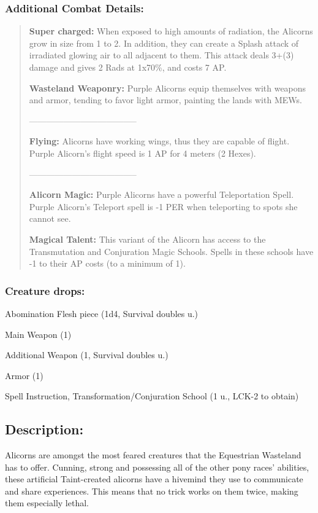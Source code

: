 \documentclass[11pt,a4paper,twocolumn]{book}
\begin{document}
	\subsubsection*{Additional Combat Details:}
	\begin{verse}
		
		\textbf{Super charged:} When exposed to high amounts of radiation, the Alicorns grow in size from 1 to 2. In addition, they can create a Splash attack of irradiated glowing air to all adjacent to them. This attack deals 3+(3) damage and gives 2 Rads at 1x70\%, and costs 7 AP.
		
		\textbf{Wasteland Weaponry:} Purple Alicorns equip themselves with weapons and armor, tending to favor light armor, painting the lands with MEWs.
		
		--------------------------------------	
		
		\textbf{Flying:} Alicorns have working wings, thus they are capable of flight. Purple Alicorn's flight speed is 1 AP for 4 meters (2 Hexes).
		
		--------------------------------------
		
		\textbf{Alicorn Magic:} Purple Alicorns have a powerful Teleportation Spell. Purple Alicorn's Teleport spell is -1 PER when teleporting to spots she cannot see.
		
		\textbf{Magical Talent:} This variant of the Alicorn has access to the Transmutation and Conjuration Magic Schools. Spells in these schools have -1 to their AP costs (to a minimum of 1).

	\end{verse}
	
	\subsubsection*{Creature drops:}
	\begin{compactitem}
		\item Abomination Flesh piece (1d4, Survival doubles u.)
		\item Main Weapon (1)
		\item Additional Weapon (1, Survival doubles u.)
		\item Armor (1)
		\item Spell Instruction, Transformation/Conjuration School (1 u., LCK-2 to obtain)
	\end{compactitem}
	
	\subsection*{Description:}	
	Alicorns are amongst the most feared creatures that the Equestrian Wasteland has to offer. Cunning, strong and possessing all of the other pony races' abilities, these artificial Taint-created alicorns have a hivemind they use to communicate and share experiences. This means that no trick works on them twice, making them especially lethal. 
	
\end{document}
